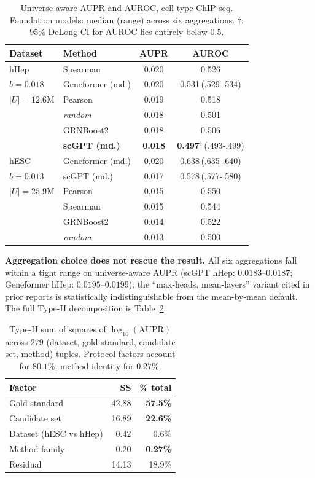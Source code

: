 \documentclass[sigconf, nonacm, anonymous]{acmart}
\begin{document}
\begin{table}[t]
\caption{Universe-aware AUPR and AUROC, cell-type ChIP-seq.
Foundation models: median (range) across six aggregations.
$\dagger$: 95\% DeLong CI for AUROC lies entirely below $0.5$.}
\label{tab:headline}
\footnotesize
\setlength{\tabcolsep}{4pt}
\begin{tabular}{llcc}
\toprule
Dataset & Method & AUPR & AUROC \\
\midrule
hHep        & Spearman                & 0.020 & 0.526 \\
$b{=}0.018$ & Geneformer (md.)        & 0.020 & 0.531\,(.529-.534) \\
$|U|{=}12.6$M & Pearson               & 0.019 & 0.518 \\
            & \emph{random}           & 0.018 & 0.501 \\
            & GRNBoost2               & 0.018 & 0.506 \\
            & \textbf{scGPT (md.)}    & \textbf{0.018} & \textbf{0.497$^{\dagger}$}\,(.493-.499) \\
\midrule
hESC        & Geneformer (md.)        & 0.020 & 0.638\,(.635-.640) \\
$b{=}0.013$ & scGPT (md.)             & 0.017 & 0.578\,(.577-.580) \\
$|U|{=}25.9$M & Pearson               & 0.015 & 0.550 \\
            & Spearman                & 0.015 & 0.544 \\
            & GRNBoost2               & 0.014 & 0.522 \\
            & \emph{random}           & 0.013 & 0.500 \\
\bottomrule
\end{tabular}
\end{table}

\textbf{Aggregation choice does not rescue the result.} All six
aggregations fall within a tight range on universe-aware AUPR
(scGPT hHep: $0.0183$--$0.0187$; Geneformer hHep:
$0.0195$--$0.0199$); the ``max-heads, mean-layers'' variant cited in
prior reports is statistically indistinguishable from the
mean-by-mean default. The full Type-II decomposition is
Table~\ref{tab:anova}.

\begin{table}[t]
\caption{Type-II sum of squares of $\log_{10}(\text{AUPR})$ across
279 (dataset, gold standard, candidate set, method) tuples. Protocol
factors account for $80.1\%$; method identity for $0.27\%$.}
\label{tab:anova}
\footnotesize
\setlength{\tabcolsep}{6pt}
\begin{tabular}{lrr}
\toprule
Factor & SS & \% total \\
\midrule
Gold standard           & 42.88 & \textbf{57.5\%} \\
Candidate set           & 16.89 & \textbf{22.6\%} \\
Dataset (hESC vs hHep)  & 0.42  & 0.6\% \\
Method family           & 0.20  & \textbf{0.27\%} \\
Residual                & 14.13 & 18.9\% \\
\bottomrule
\end{tabular}
\end{table}
\end{document}

